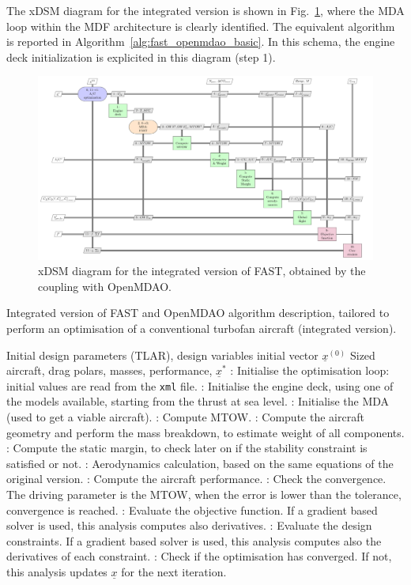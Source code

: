 The xDSM diagram for the integrated version is shown in Fig.~\ref{fig:fast_openmdao_basic}, where the MDA loop within the MDF architecture is clearly identified. 
The equivalent algorithm is reported in Algorithm~\ref{alg:fast_openmdao_basic}.
In this schema, the engine deck initialization is explicited in this diagram (step 1).
\begin{figure}[!h]
	\centering
	\includegraphics[keepaspectratio, width=1.3\textwidth, angle=90]{images/chap2/FAST_OpenMDAO_basic}
	\caption{xDSM diagram for the integrated version of FAST, obtained by the coupling with OpenMDAO.}
	\label{fig:fast_openmdao_basic}
\end{figure}
\begin{algorithm}[!h]
	\caption{Integrated version of FAST and OpenMDAO algorithm description, tailored to perform an optimisation of a conventional turbofan aircraft (integrated version).}
	\label{alg:fast_openmdao_basic}
	\begin{algorithmic}
		\REQUIRE Initial design parameters (TLAR), design variables initial vector $\underline{x}^{(0)}$
		\ENSURE Sized aircraft, drag polars, masses, performance, $\underline{x}^*$
		: Initialise the optimisation loop: initial values are read from the \texttt{xml} file.
		\REPEAT
		: Initialise the engine deck, using one of the models available, starting from the thrust at sea level.
		: Initialise the MDA (used to get a viable aircraft).
		\REPEAT
		: Compute MTOW.
		: Compute the aircraft geometry and perform the mass breakdown, to estimate weight of all components.
		: Compute the static margin, to check later on if the stability constraint is satisfied or not.
		: Aerodynamics calculation, based on the same equations of the original version.
		: Compute the aircraft performance.
		: Check the convergence. The driving parameter is the MTOW, when the error is lower than the tolerance, convergence is reached.
		: Evaluate the objective function. If a gradient based solver is used, this analysis computes also derivatives.
		: Evaluate the design constraints. If a gradient based solver is used, this analysis computes also the derivatives of each constraint.
		: Check if the optimisation has converged. If not, this analysis updates $\underline{x}$ for the next iteration.
	\end{algorithmic}
\end{algorithm}
